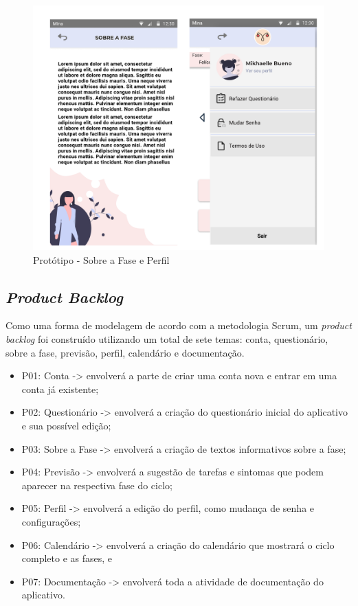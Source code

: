 \begin{figure}[ht]
    \centering
    \includegraphics[keepaspectratio=true,scale=0.4]{figuras/prototipo3.pdf}
    \caption{Protótipo - Sobre a Fase e Perfil}
        \label{fig11}
\end{figure}

\subsection{\emph{Product Backlog}}
Como uma forma de modelagem de acordo com a metodologia Scrum, 
um \emph{product backlog} foi construído utilizando um total de 
sete temas: conta, questionário, sobre a fase, previsão, perfil, 
calendário e documentação.

\begin{itemize}
    \item P01: Conta -> envolverá a parte de criar uma conta nova e entrar em uma conta já existente;
    \item P02: Questionário -> envolverá a criação do questionário inicial do aplicativo e sua possível edição;
\item P03: Sobre a Fase -> envolverá a criação de textos informativos sobre a fase;
\item P04: Previsão -> envolverá a sugestão de tarefas e sintomas que podem aparecer na respectiva fase do ciclo;
\item P05: Perfil -> envolverá a edição do perfil, como mudança de senha e configurações;
\item P06: Calendário -> envolverá a criação do calendário que mostrará o ciclo completo e as fases, e
\item P07: Documentação -> envolverá toda a atividade de documentação do aplicativo.

\end{itemize}

